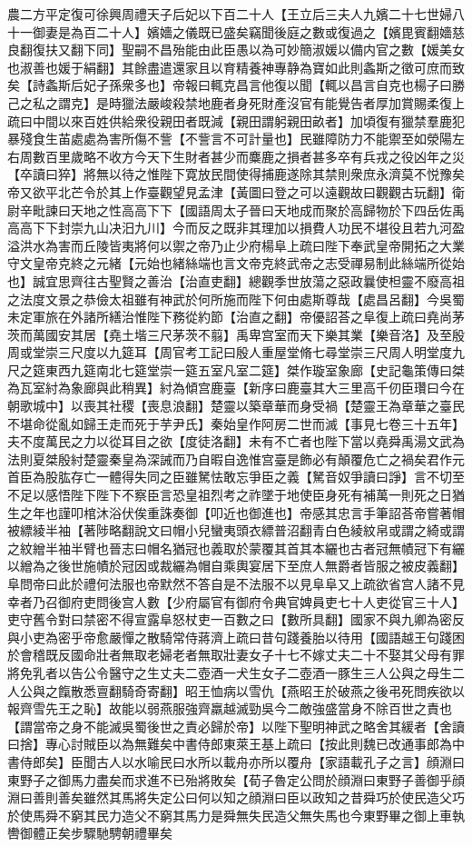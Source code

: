 農二方平定復可徐興周禮天子后妃以下百二十人【王立后三夫人九嬪二十七世婦八十一御妻是為百二十人】嬪嬙之儀既已盛矣竊聞後庭之數或復過之【嬪毘賓翻嬙慈良翻復扶又翻下同】聖嗣不昌殆能由此臣愚以為可妙簡淑媛以備内官之數【媛美女也淑善也媛于絹翻】其餘盡遣還家且以育精養神專静為寶如此則螽斯之徵可庶而致矣【詩螽斯后妃子孫衆多也】帝報曰輒克昌言他復以聞【輒以昌言自克也楊子曰勝己之私之謂克】是時獵法嚴峻殺禁地鹿者身死財產沒官有能覺告者厚加賞賜柔復上疏曰中間以來百姓供給衆役親田者既減【親田謂躬親田畝者】加頃復有獵禁羣鹿犯暴殘食生苖處處為害所傷不訾【不訾言不可計量也】民雖障防力不能禦至如滎陽左右周數百里歲略不收方今天下生財者甚少而麋鹿之損者甚多卒有兵戎之役凶年之災【卒讀曰猝】將無以待之惟陛下寛放民間使得捕鹿遂除其禁則衆庶永濟莫不悦豫矣帝又欲平北芒令於其上作臺觀望見孟津【黃圖曰登之可以遠觀故曰觀觀古玩翻】衛尉辛毗諫曰天地之性高高下下【國語周太子晉曰天地成而聚於高歸物於下四岳佐禹高高下下封崇九山决汨九川】今而反之既非其理加以損費人功民不堪役且若九河盈溢洪水為害而丘陵皆夷將何以禦之帝乃止少府楊阜上疏曰陛下奉武皇帝開拓之大業守文皇帝克終之元緒【元始也緒絲端也言文帝克終武帝之志受禪易制此絲端所從始也】誠宜思齊往古聖賢之善治【治直吏翻】總觀季世放蕩之惡政曩使柦靈不廢高祖之法度文景之恭儉太祖雖有神武於何所施而陛下何由處斯尊哉【處昌呂翻】今吳蜀未定軍旅在外諸所繕治惟陛下務從約節【治直之翻】帝優詔荅之阜復上疏曰堯尚茅茨而萬國安其居【堯土堦三尺茅茨不翦】禹卑宫室而天下樂其業【樂音洛】及至殷周或堂崇三尺度以九筵耳【周官考工記曰殷人重屋堂脩七尋堂崇三尺周人明堂度九尺之筵東西九筵南北七筵堂崇一筵五室凡室二筵】桀作璇室象廊【史記龜策傳曰桀為瓦室紂為象廊與此稍異】紂為傾宫鹿臺【新序曰鹿臺其大三里高千仞臣瓚曰今在朝歌城中】以喪其社稷【喪息浪翻】楚靈以築章華而身受禍【楚靈王為章華之臺民不堪命從亂如歸王走而死于芋尹氏】秦始皇作阿房二世而滅【事見七卷三十五年】夫不度萬民之力以從耳目之欲【度徒洛翻】未有不亡者也陛下當以堯舜禹湯文武為法則夏桀殷紂楚靈秦皇為深誡而乃自暇自逸惟宫臺是飾必有顛覆危亡之禍矣君作元首臣為股肱存亡一體得失同之臣雖駑怯敢忘爭臣之義【駑音奴爭讀曰諍】言不切至不足以感悟陛下陛下不察臣言恐皇祖烈考之祚墜于地使臣身死有補萬一則死之日猶生之年也謹叩棺沐浴伏俟重誅奏御【叩近也御進也】帝感其忠言手筆詔荅帝嘗著帽被縹綾半袖【著陟略翻說文曰帽小兒蠻夷頭衣縹普沼翻青白色綾紋帛或謂之綺或謂之紋繒半袖半臂也晉志曰帽名猶冠也義取於蒙覆其首其本纚也古者冠無幘冠下有纚以繒為之後世施幘於冠因或裁纚為帽自乘輿宴居下至庶人無爵者皆服之被皮義翻】阜問帝曰此於禮何法服也帝默然不答自是不法服不以見阜阜又上疏欲省宫人諸不見幸者乃召御府吏問後宫人數【少府屬官有御府令典官婢員吏七十人吏從官三十人】吏守舊令對曰禁密不得宣露阜怒杖吏一百數之曰【數所具翻】國家不與九卿為密反與小吏為密乎帝愈嚴憚之散騎常侍蔣濟上疏曰昔句踐養胎以待用【國語越王句踐困於會稽既反國命壯者無取老婦老者無取壯妻女子十七不嫁丈夫二十不娶其父母有罪將免乳者以告公令醫守之生丈夫二壺酒一犬生女子二壺酒一豚生三人公與之母生二人公與之餼散悉亶翻騎奇寄翻】昭王恤病以雪仇【燕昭王於破燕之後弔死問疾欲以報齊雪先王之恥】故能以弱燕服強齊羸越滅勁吳今二敵強盛當身不除百世之責也【謂當帝之身不能滅吳蜀後世之責必歸於帝】以陛下聖明神武之略舍其緩者【舍讀曰捨】專心討賊臣以為無難矣中書侍郎東萊王基上疏曰【按此則魏已改通事郎為中書侍郎矣】臣聞古人以水喻民曰水所以載舟亦所以覆舟【家語載孔子之言】顔淵曰東野子之御馬力盡矣而求進不已殆將敗矣【荀子魯定公問於顔淵曰東野子善御乎顔淵曰善則善矣雖然其馬將失定公曰何以知之顔淵曰臣以政知之昔舜巧於使民造父巧於使馬舜不窮其民力造父不窮其馬力是舜無失民造父無失馬也今東野畢之御上車執轡御體正矣步驟馳騁朝禮畢矣